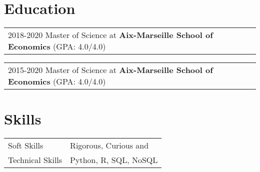 \documentclass[a4paper,12pt]{article}
\begin{document}
\section{Education}
\begin{tabularx}{\linewidth}{@{}l X@{}}	
2018-2020 Master of Science at \textbf{Aix-Marseille School of Economics} \hfill \normalsize (GPA: 4.0/4.0) \\
\end{tabularx}

\begin{tabularx}{\linewidth}{@{}l X@{}}	
2015-2020 Master of Science at \textbf{Aix-Marseille School of Economics} \hfill \normalsize (GPA: 4.0/4.0) \\

\end{tabularx}

\section{Skills}
\begin{tabularx}{\linewidth}{@{}l X@{}}
Soft Skills &  \normalsize{ Rigorous, Curious and }\\
Technical Skills  &  \normalsize{Python, R, SQL, NoSQL }\\  
\end{tabularx}

\vfill
{}
\end{document}
